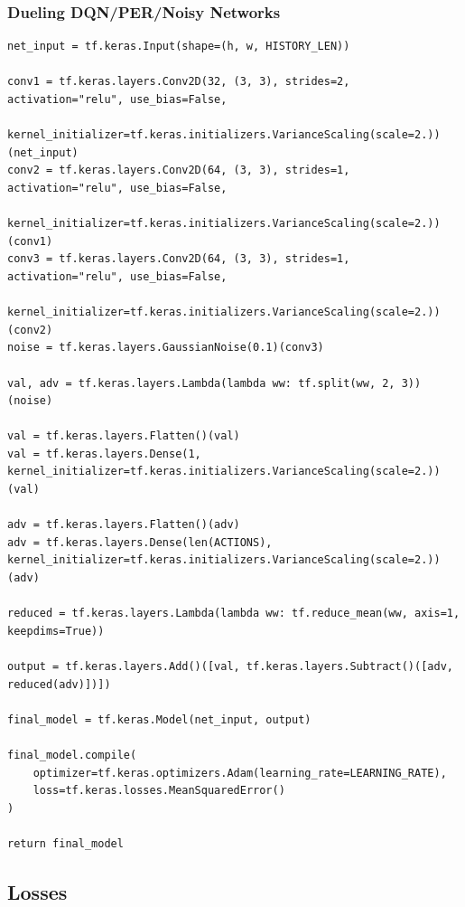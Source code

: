 \documentclass[12pt,a4paper]{article}
\begin{document}
    \subsubsection{Dueling DQN/PER/Noisy Networks}
    \begin{lstlisting}[label={lst:ddqnnoisy}]
net_input = tf.keras.Input(shape=(h, w, HISTORY_LEN))

conv1 = tf.keras.layers.Conv2D(32, (3, 3), strides=2, activation="relu", use_bias=False,
                               kernel_initializer=tf.keras.initializers.VarianceScaling(scale=2.))(net_input)
conv2 = tf.keras.layers.Conv2D(64, (3, 3), strides=1, activation="relu", use_bias=False,
                               kernel_initializer=tf.keras.initializers.VarianceScaling(scale=2.))(conv1)
conv3 = tf.keras.layers.Conv2D(64, (3, 3), strides=1, activation="relu", use_bias=False,
                               kernel_initializer=tf.keras.initializers.VarianceScaling(scale=2.))(conv2)
noise = tf.keras.layers.GaussianNoise(0.1)(conv3)

val, adv = tf.keras.layers.Lambda(lambda ww: tf.split(ww, 2, 3))(noise)

val = tf.keras.layers.Flatten()(val)
val = tf.keras.layers.Dense(1, kernel_initializer=tf.keras.initializers.VarianceScaling(scale=2.))(val)

adv = tf.keras.layers.Flatten()(adv)
adv = tf.keras.layers.Dense(len(ACTIONS), kernel_initializer=tf.keras.initializers.VarianceScaling(scale=2.))(adv)

reduced = tf.keras.layers.Lambda(lambda ww: tf.reduce_mean(ww, axis=1, keepdims=True))

output = tf.keras.layers.Add()([val, tf.keras.layers.Subtract()([adv, reduced(adv)])])

final_model = tf.keras.Model(net_input, output)

final_model.compile(
    optimizer=tf.keras.optimizers.Adam(learning_rate=LEARNING_RATE),
    loss=tf.keras.losses.MeanSquaredError()
)

return final_model
    \end{lstlisting}

    \subsection{Losses}\label{subsec:losses}
\end{document}
